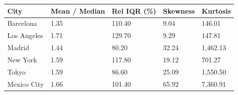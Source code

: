 \begin{tabular}{lllll}
\toprule
City & Mean / Median & Rel IQR (\%) & Skewness & Kurtosis \\
\midrule
Barcelona & 1.35 & 110.40 & 9.04 & 146.01 \\
Los Angeles & 1.71 & 129.70 & 9.29 & 147.81 \\
Madrid & 1.44 & 80.20 & 32.24 & 1,462.13 \\
New York & 1.59 & 117.80 & 19.12 & 701.27 \\
Tokyo & 1.59 & 86.60 & 25.09 & 1,550.50 \\
Mexico City & 1.66 & 101.40 & 65.92 & 7,360.91 \\
\bottomrule
\end{tabular}
